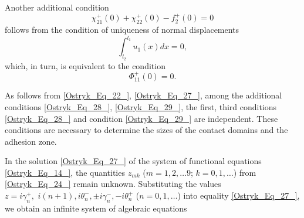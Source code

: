 Another additional condition
\begin{equation} \label{Ostryk_Eq_29_} 
\chi _{21}^{+} (0)+\chi _{22}^{+} (0)-f_{2}^{+} (0)=0 
\end{equation} 
follows from the condition of uniqueness of normal displacements
\begin{equation} \label{Ostryk_Eq_30_} 
\int _{l_{2} }^{l_{1} }u_{1} (x)dx =0,  
\end{equation} 
which, in turn, is equivalent to the condition
\begin{equation} \label{Ostryk_Eq_31_} 
\Phi _{11}^{+} (0)=0.  
\end{equation} 

As follows from \eqref{Ostryk_Eq_22_}, \eqref{Ostryk_Eq_27_}, among the additional conditions \eqref{Ostryk_Eq_28_}, \eqref{Ostryk_Eq_29_}, the first, third conditions \eqref{Ostryk_Eq_28_} and condition \eqref{Ostryk_Eq_29_} are independent. These conditions are necessary to determine the sizes of the contact domains and the adhesion zone.

In the solution \eqref{Ostryk_Eq_27_} of the system of functional equations \eqref{Ostryk_Eq_14_}, the quantities $z_{mk} $ ($m=1,2, \dots 9$; $k=0,1,\dots$) from \eqref{Ostryk_Eq_24_} remain unknown. Substituting the values $z=i\gamma _{n}^{+} ,\, \, i(n+1), i\theta _{n}^{-} , \pm i\gamma _{n}^{-} , -i\theta _{n}^{+} $ ($n=0,1,\dots$) into equality \eqref{Ostryk_Eq_27_}, we obtain an infinite system of algebraic equations

